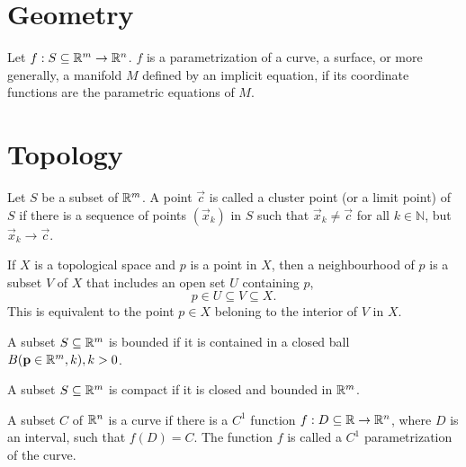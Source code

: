 \documentclass{article}
\begin{document}
\section{Geometry}
\begin{definition}[Parametrization]
    Let $f: S \subseteq \mathbb{R}^m \rightarrow \mathbb{R}^n$. $f$ is a
    parametrization of a curve, a surface, or more generally, a manifold $M$
    defined by an implicit equation, if its coordinate functions are the parametric equations
    of $M$.
\end{definition}

\section{Topology}
\begin{definition}
    Let $S$ be a subset of $\mathbb{R}^m$. A point $\vec{c}$ is
    called a cluster point (or a limit point) of $S$ if there is a
    sequence of points $(\vec{x}_k)$ in $S$ such that $\vec{x}_k \neq \vec{c}$ for
    all $k \in \mathbb{N}$, but $\vec{x}_k \rightarrow \vec{c}$.
\end{definition}

\begin{definition}
    If $X$ is a topological space and $p$ is a point in $X$,
    then a neighbourhood of $p$ is a subset $V$ of $X$ that
    includes an open set $U$ containing $p$,
    \begin{equation*}
        p \in U \subseteq V \subseteq X.
    \end{equation*}
    This is equivalent to the point $p \in X$ beloning to the
    interior of $V$ in $X$.
\end{definition}

\begin{definition}
    A subset $S \subseteq \mathbb{R}^m$ is bounded if it is contained in a closed
    ball $B(\mathbf{p} \in \mathbb{R}^m, k), k > 0$.
\end{definition}

\begin{definition}
    A subset $S \subseteq \mathbb{R}^m$ is compact if it is closed and bounded in $\mathbb{R}^m$.
\end{definition}

\begin{definition}[Curve]
    A subset $C$ of $\mathbb{R}^n$ is a curve if there is a $C^1$ function
    $f: D \subseteq \mathbb{R} \rightarrow \mathbb{R}^n$, where $D$ is an interval, such that
    $f(D) = C$. The function $f$ is called a $C^1$ parametrization of the curve.
\end{definition}
\end{document}

